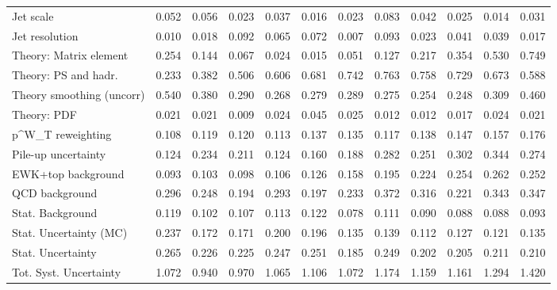\begin{tabular}{l|p{0.6cm}p{0.6cm}p{0.6cm}p{0.6cm}p{0.6cm}p{0.6cm}p{0.6cm}p{0.6cm}p{0.6cm}p{0.6cm}p{0.6cm}}
Jet scale                                & 0.052 & 0.056 & 0.023 & 0.037 & 0.016 & 0.023 & 0.083 & 0.042 & 0.025 & 0.014 & 0.031 \\
Jet resolution                           & 0.010 & 0.018 & 0.092 & 0.065 & 0.072 & 0.007 & 0.093 & 0.023 & 0.041 & 0.039 & 0.017 \\
Theory: Matrix element                   & 0.254 & 0.144 & 0.067 & 0.024 & 0.015 & 0.051 & 0.127 & 0.217 & 0.354 & 0.530 & 0.749 \\
Theory: PS and hadr.                     & 0.233 & 0.382 & 0.506 & 0.606 & 0.681 & 0.742 & 0.763 & 0.758 & 0.729 & 0.673 & 0.588 \\
Theory smoothing (uncorr)                & 0.540 & 0.380 & 0.290 & 0.268 & 0.279 & 0.289 & 0.275 & 0.254 & 0.248 & 0.309 & 0.460 \\
Theory: PDF                              & 0.021 & 0.021 & 0.009 & 0.024 & 0.045 & 0.025 & 0.012 & 0.012 & 0.017 & 0.024 & 0.021 \\
p^{W}_{T} reweighting                    & 0.108 & 0.119 & 0.120 & 0.113 & 0.137 & 0.135 & 0.117 & 0.138 & 0.147 & 0.157 & 0.176 \\
Pile-up uncertainty                      & 0.124 & 0.234 & 0.211 & 0.124 & 0.160 & 0.188 & 0.282 & 0.251 & 0.302 & 0.344 & 0.274 \\
EWK+top background                       & 0.093 & 0.103 & 0.098 & 0.106 & 0.126 & 0.158 & 0.195 & 0.224 & 0.254 & 0.262 & 0.252 \\
QCD background                           & 0.296 & 0.248 & 0.194 & 0.293 & 0.197 & 0.233 & 0.372 & 0.316 & 0.221 & 0.343 & 0.347 \\
Stat. Background                         & 0.119 & 0.102 & 0.107 & 0.113 & 0.122 & 0.078 & 0.111 & 0.090 & 0.088 & 0.088 & 0.093 \\
Stat. Uncertainty (MC)                   & 0.237 & 0.172 & 0.171 & 0.200 & 0.196 & 0.135 & 0.139 & 0.112 & 0.127 & 0.121 & 0.135 \\
\hline
Stat. Uncertainty                        & 0.265 & 0.226 & 0.225 & 0.247 & 0.251 & 0.185 & 0.249 & 0.202 & 0.205 & 0.211 & 0.210 \\
\hline
Tot. Syst. Uncertainty                   & 1.072 & 0.940 & 0.970 & 1.065 & 1.106 & 1.072 & 1.174 & 1.159 & 1.161 & 1.294 & 1.420 \\
\hline
\end{tabular}
